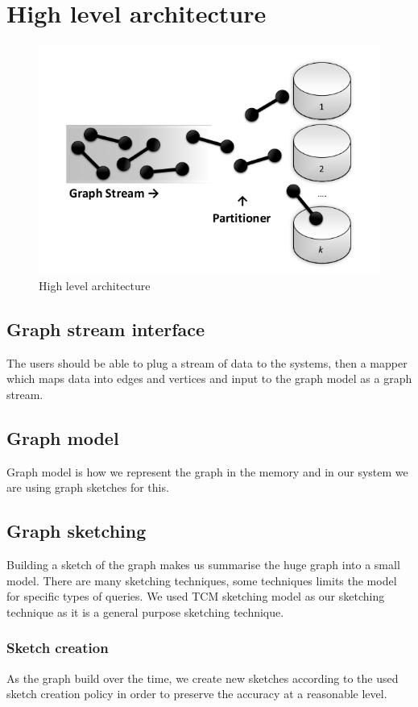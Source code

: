 \documentclass[12pt]{report}
\numberwithin{figure}{section}
\numberwithin{table}{section}
\begin{document}
\section{High level architecture}

\begin{figure}[H]
\centering
\includegraphics[scale=0.7]{images/image01}
\caption{High level architecture}
\end{figure}

\subsection{Graph stream interface}
The users should be able to plug a stream of data to the systems, then a mapper which maps data into edges and vertices and input to the graph model as a graph stream.

\subsection{Graph model}
Graph model is how we represent the graph in the memory and in our system we are using graph sketches for this. 

\subsection{Graph sketching}
Building a sketch of the graph makes us summarise the huge graph into a small model. There are many sketching techniques, some techniques limits the model for specific types of queries. We used TCM sketching model as our sketching technique as it is a general purpose sketching technique.

\subsubsection{Sketch creation}
As the graph build over the time, we create new sketches according to the used sketch creation policy in order to preserve the accuracy at a reasonable level.  
\end{document}
